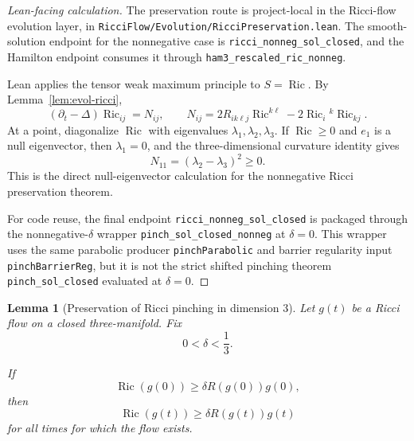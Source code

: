 \documentclass[11pt]{article}
\theoremstyle{plain}
\newtheorem{lemma}[theorem]{Lemma}
\theoremstyle{definition}
\theoremstyle{remark}
\newcommand{\Ric}{\operatorname{Ric}}
\newcommand{\del}{\delta}
\newcommand{\leanref}[1]{\nolinkurl{#1}}
\newcommand{\leanfile}[1]{\nolinkurl{#1}}
\newcommand{\rffile}[1]{\leanfile{#1}}
\begin{document}
\begin{proof}[Lean-facing calculation]
The preservation route is project-local in the Ricci-flow evolution layer, in
\rffile{RicciFlow/Evolution/RicciPreservation.lean}.
The smooth-solution endpoint for the nonnegative case is
\leanref{ricci_nonneg_sol_closed}, and the Hamilton endpoint consumes it through
\leanref{ham3_rescaled_ric_nonneg}.

Lean applies the tensor weak maximum principle to \(S=\Ric\).  By
Lemma~\ref{lem:evol-ricci},
\[
(\partial_t-\Delta)\Ric_{ij}=N_{ij},
\qquad
N_{ij}=2R_{ik\ell j}\Ric^{k\ell}-2\Ric_i{}^k\Ric_{kj}.
\]
At a point, diagonalize \(\Ric\) with eigenvalues
\(\lambda_1,\lambda_2,\lambda_3\).  If \(\Ric\ge0\) and \(e_1\) is a null
eigenvector, then \(\lambda_1=0\), and the three-dimensional curvature
identity gives
\[
N_{11}=(\lambda_2-\lambda_3)^2\ge0.
\]
This is the direct null-eigenvector calculation for the nonnegative Ricci
preservation theorem.

For code reuse, the final endpoint \leanref{ricci_nonneg_sol_closed} is
packaged through the nonnegative-\(\del\) wrapper
\leanref{pinch_sol_closed_nonneg} at \(\del=0\).  This wrapper uses the same
parabolic producer \leanref{pinchParabolic} and barrier regularity input
\leanref{pinchBarrierReg}, but it is not the strict shifted pinching theorem
\leanref{pinch_sol_closed} evaluated at \(\del=0\).
\end{proof}

\begin{lemma}[Preservation of Ricci pinching in dimension $3$]
\label{lem:preserve-ricci-pinching}
Let $g(t)$ be a Ricci flow on a closed three-manifold. Fix
\[
0<\del<\frac13.
\]

If
\[
\Ric(g(0))\ge \del R(g(0))g(0),
\]
then
\[
\Ric(g(t))\ge \del R(g(t))g(t)
\]
for all times for which the flow exists.
\end{lemma}
\end{document}
